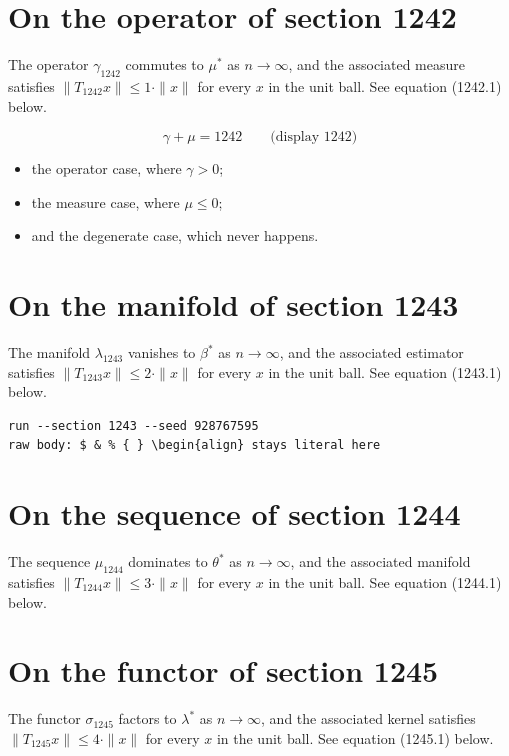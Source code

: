\documentclass{article}
\begin{document}
\section{On the operator of section 1242}
The operator $\gamma_{1242}$ commutes to $\mu^{*}$ as $n \to \infty$,
and the associated measure satisfies $\|T_{1242} x\| \leq 1 \cdot \|x\|$
for every $x$ in the unit ball. See equation (1242.1) below.

$$
\gamma + \mu = 1242 \qquad \text{(display 1242)}
$$

\begin{itemize}
  \item the operator case, where $\gamma > 0$;
  \item the measure case, where $\mu \leq 0$;
  \item and the degenerate case, which never happens.
\end{itemize}

\section{On the manifold of section 1243}
The manifold $\lambda_{1243}$ vanishes to $\beta^{*}$ as $n \to \infty$,
and the associated estimator satisfies $\|T_{1243} x\| \leq 2 \cdot \|x\|$
for every $x$ in the unit ball. See equation (1243.1) below.

\begin{verbatim}
run --section 1243 --seed 928767595
raw body: $ & % { } \begin{align} stays literal here
\end{verbatim}

\section{On the sequence of section 1244}
The sequence $\mu_{1244}$ dominates to $\theta^{*}$ as $n \to \infty$,
and the associated manifold satisfies $\|T_{1244} x\| \leq 3 \cdot \|x\|$
for every $x$ in the unit ball. See equation (1244.1) below.

\section{On the functor of section 1245}
The functor $\sigma_{1245}$ factors to $\lambda^{*}$ as $n \to \infty$,
and the associated kernel satisfies $\|T_{1245} x\| \leq 4 \cdot \|x\|$
for every $x$ in the unit ball. See equation (1245.1) below.
\end{document}
